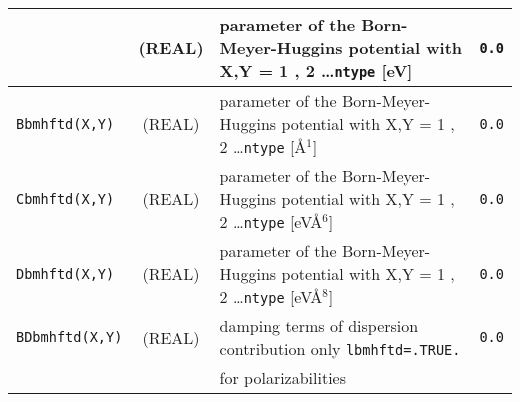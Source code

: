 \documentclass[a4paper,8pt]{article}
\begin{document}
\begin{longtable}{l|c|m{8cm}|m{2cm}}
                 & (REAL)             & parameter of the Born-Meyer-Huggins potential 
                                        with X,Y = 1 , 2 \ldots \verb?ntype? [eV]                                           & \verb?0.0? \\
\hline
\rule[-0.75cm]{0cm}{1.5cm}
\verb?Bbmhftd(X,Y)?          
                 & (REAL)             & parameter of the Born-Meyer-Huggins potential 
                                        with X,Y = 1 , 2 \ldots \verb?ntype? [\AA$^1$]                                      & \verb?0.0? \\
\hline
\rule[-0.75cm]{0cm}{1.5cm}
\verb?Cbmhftd(X,Y)?          
                 & (REAL)             & parameter of the Born-Meyer-Huggins potential
                                        with X,Y = 1 , 2 \ldots \verb?ntype? [eV\AA$^6$]                                    & \verb?0.0? \\
\hline
\rule[-0.75cm]{0cm}{1.5cm}
\verb?Dbmhftd(X,Y)?          
                 & (REAL)             & parameter of the Born-Meyer-Huggins potential
                                        with X,Y = 1 , 2 \ldots \verb?ntype? [eV\AA$^8$]                                    & \verb?0.0? \\
\hline
\rule[-0.75cm]{0cm}{1.5cm}
\verb?BDbmhftd(X,Y)?         
                 & (REAL)             &  damping terms of dispersion contribution only \verb?lbmhftd=.TRUE.?                & \verb?0.0? \\
\hline
\hline
\rule[-0.75cm]{0cm}{1.5cm}
                 &                    & for polarizabilities                                                                &  \\


\end{longtable}
\end{document}
